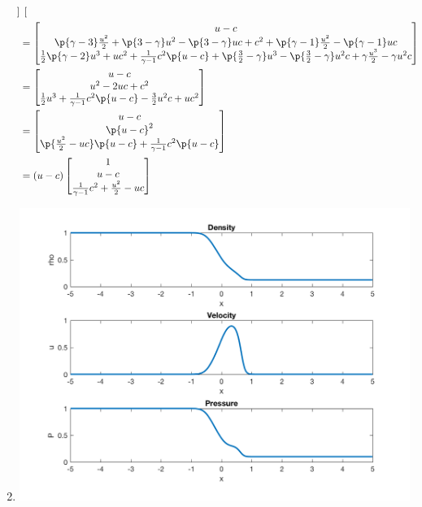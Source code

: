 \documentclass[11pt, oneside]{article}
\begin{document}
\begin{enumerate}
\begin{align*}
\begin{bmatrix}
      \end{bmatrix} \\
      &=
      \begin{bmatrix}
        u - c \\
        \p{\gamma - 3} \frac{u^2}{2} + \p{3 - \gamma}u^2 - \p{3 - \gamma}uc + c^2 + \p{\gamma - 1}\frac{u^2}{2} - \p{\gamma - 1}uc \\
        \frac{1}{2}\p{\gamma - 2} u^3 + uc^2 + \frac{1}{\gamma - 1}c^2\p{u-c} + \p{\frac{3}{2} - \gamma}u^3 - \p{\frac{3}{2} - \gamma}u^2c + \gamma\frac{u^3}{2} - \gamma u^2c
      \end{bmatrix} \\
      &=
      \begin{bmatrix}
        u - c \\
        u^2 - 2uc + c^2 \\
        \frac{1}{2} u^3 + \frac{1}{\gamma - 1}c^2\p{u-c} - \frac{3}{2}u^2c + uc^2
      \end{bmatrix} \\
      &=
      \begin{bmatrix}
        u - c \\
        \p{u - c}^2 \\
        \p{\frac{u^2}{2} - uc}\p{u - c} + \frac{1}{\gamma - 1}c^2\p{u - c}
      \end{bmatrix} \\
      &= (u - c)
      \begin{bmatrix}
        1 \\
        u - c \\
        \frac{1}{\gamma - 1}c^2 + \frac{u^2}{2} - uc
      \end{bmatrix} \\
    \end{align*}

  \item %
    
    
    

    \begin{center}
      \includegraphics[scale=0.5]{Figures/finalProject.png}
    \end{center}
    
\end{enumerate}
\end{document}
